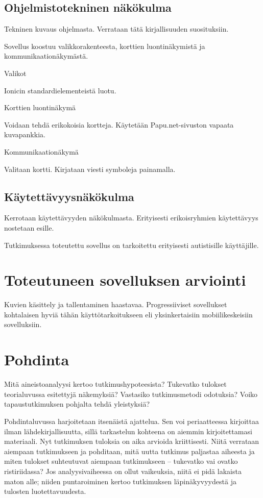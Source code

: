 \documentclass[utf8]{gradu3}
\begin{document}
\section{Ohjelmistotekninen näkökulma}
Tekninen kuvaus ohjelmasta. Verrataan tätä kirjallisuuden suosituksiin.

Sovellus koostuu valikkorakenteesta, korttien luontinäkymistä ja kommunikaationäkymästä.

Valikot

Ionicin standardielementeistä luotu.

Korttien luontinäkymä

Voidaan tehdä erikokoisia kortteja. Käytetään Papu.net-sivuston vapaata kuvapankkia.

Kommunikaationäkymä

Valitaan kortti. Kirjataan viesti symboleja painamalla.

\section{Käytettävyysnäkökulma}

Kerrotaan käytettävyyden näkökulmasta. Erityisesti erikoisryhmien käytettävyys nostetaan esille.

Tutkimuksessa toteutettu sovellus on tarkoitettu erityisesti autistisille käyttäjille.

\chapter{Toteutuneen sovelluksen arviointi}

Kuvien käsittely ja tallentaminen haastavaa. Progressiiviset sovellukset kohtalaisen hyviä tähän käyttötarkoitukseen eli yksinkertaisiin mobiilikeskeisiin sovelluksiin.


\chapter{Pohdinta}

Mitä aineistoanalyysi kertoo tutkimushypoteesista? Tukevatko tulokset teorialuvussa esitettyjä näkemyksiä? Vastasiko tutkimusmetodi odotuksia? Voiko tapaustutkimuksen pohjalta tehdä yleistyksiä?

Pohdintaluvussa harjoitetaan itsenäistä ajattelua. Sen voi periaatteessa kirjoittaa ilman lähdekirjallisuutta, sillä tarkastelun kohteena on aiemmin kirjoitettamasi materiaali. Nyt tutkimuksen tuloksia on aika arvioida kriittisesti. Niitä verrataan aiempaan tutkimukseen ja pohditaan, mitä uutta tutkimus paljastaa aiheesta ja miten tulokset suhteutuvat aiempaan tutkimukseen – tukevatko vai ovatko ristiriidassa? Jos analyysivaiheessa on ollut vaikeuksia, niitä ei pidä lakaista maton alle; niiden puntaroiminen kertoo tutkimuksen läpinäkyvyydestä ja tulosten luotettavuudesta. 
\end{document}
